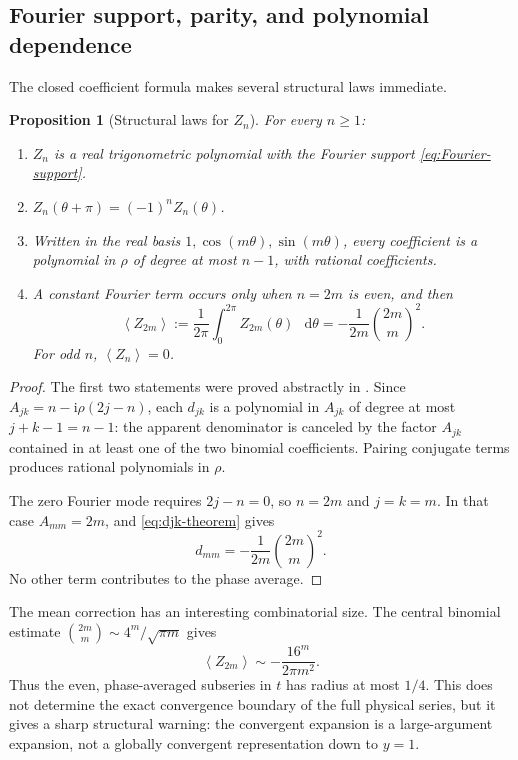 \documentclass[11pt,oneside]{article}
\theoremstyle{plain}
\newtheorem{proposition}[theorem]{Proposition}
\theoremstyle{definition}
\theoremstyle{remark}
\newcommand{\ii}{\mathrm{i}}
\newcommand{\dd}{\mathop{}\!\mathrm{d}}
\newcommand{\avg}[1]{\left\langle#1\right\rangle}
\begin{document}
\subsection{Fourier support, parity, and polynomial dependence}

The closed coefficient formula makes several structural laws immediate.

\begin{proposition}[Structural laws for \(Z_n\)]
\label{prop:Zn-laws}
For every \(n\ge1\):
\begin{enumerate}
\item \(Z_n\) is a real trigonometric polynomial with the Fourier support
\eqref{eq:Fourier-support}.
\item \(Z_n(\theta+\pi)=(-1)^nZ_n(\theta)\).
\item Written in the real basis \(1,\cos(m\theta),\sin(m\theta)\), every
coefficient is a polynomial in \(\rho\) of degree at most \(n-1\), with
rational coefficients.
\item A constant Fourier term occurs only when \(n=2m\) is even, and then
\begin{equation}
 \avg{Z_{2m}}
 :=\frac1{2\pi}\int_0^{2\pi}Z_{2m}(\theta)\,\dd\theta
 =-\frac1{2m}\binom{2m}{m}^{\!2}.
 \label{eq:mean-Z}
\end{equation}
For odd \(n\), \(\avg{Z_n}=0\).
\end{enumerate}
\end{proposition}

\begin{proof}
The first two statements were proved abstractly in
.  Since \(A_{jk}=n-\ii\rho(2j-n)\), each
\(d_{jk}\) is a polynomial in \(A_{jk}\) of degree at most \(j+k-1=n-1\):
the apparent denominator is canceled by the factor \(A_{jk}\) contained in
at least one of the two binomial coefficients.  Pairing conjugate terms
produces rational polynomials in \(\rho\).

The zero Fourier mode requires \(2j-n=0\), so \(n=2m\) and \(j=k=m\).  In
that case \(A_{mm}=2m\), and \eqref{eq:djk-theorem} gives
\[
 d_{mm}=-\frac1{2m}\binom{2m}{m}^2.
\]
No other term contributes to the phase average.
\end{proof}

The mean correction has an interesting combinatorial size.  The central
binomial estimate
\(\binom{2m}{m}\sim4^m/\sqrt{\pi m}\) gives
\begin{equation}
 \avg{Z_{2m}}
 \sim-\frac{16^m}{2\pi m^2}.
 \label{eq:mean-growth}
\end{equation}
Thus the even, phase-averaged subseries in \(t\) has radius at most \(1/4\).
This does not determine the exact convergence boundary of the full physical
series, but it gives a sharp structural warning: the convergent expansion is a
large-argument expansion, not a globally convergent representation down to
\(y=1\).
\end{document}
